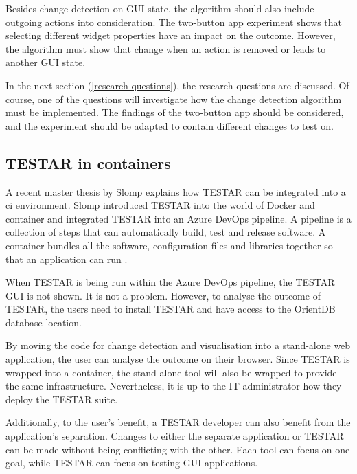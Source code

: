 Besides change detection on GUI state, the algorithm should also include outgoing actions into consideration. The two-button app experiment shows that selecting different widget properties have an impact on the outcome. However, the algorithm must show that change when an action is removed or leads to another GUI state.   

In the next section (\ref{research-questions}), the research questions are discussed. Of course, one of the questions will investigate how the change detection algorithm must be implemented. The findings of the two-button app should be considered, and the experiment should be adapted to contain different changes to test on. 

\subsection{TESTAR in containers}
A recent master thesis by Slomp explains how TESTAR can be integrated into a \acrfull{ci} environment. Slomp introduced TESTAR into the world of Docker and container and integrated TESTAR into an Azure DevOps pipeline. A pipeline is a collection of steps that can automatically build, test and release software. A container bundles all the software, configuration files and libraries together so that an application can run \cite{ms-container}. 

When TESTAR is being run within the Azure DevOps pipeline, the TESTAR GUI is not shown. It is not a problem. However, to analyse the outcome of TESTAR, the users need to install TESTAR and have access to the OrientDB database location. 

By moving the code for change detection and visualisation into a stand-alone web application, the user can analyse the outcome on their browser. Since TESTAR is wrapped into a container, the stand-alone tool will also be wrapped to provide the same infrastructure. Nevertheless, it is up to the IT administrator how they deploy the TESTAR suite. 

Additionally, to the user's benefit, a TESTAR developer can also benefit from the application's separation. Changes to either the separate application or TESTAR can be made without being conflicting with the other. Each tool can focus on one goal, while TESTAR can focus on testing GUI applications. 